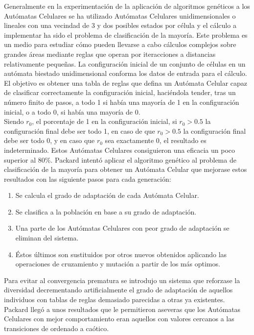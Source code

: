 Generalmente en la experimentación de la aplicación de algoritmos genéticos a los Autómatas Celulares se ha utilizado Autómatas Celulares unidimensionales o lineales con una vecindad de 3 y dos posibles estados por célula y el cálculo a implementar ha sido el problema de clasificación de la mayoría. Este problema es un medio para estudiar cómo pueden llevarse a cabo cálculos complejos sobre grandes áreas mediante reglas que operan por iteracciones a distancias relativamente pequeñas. La configuración inicial de un conjunto de células en un autómata biestado unidimensional conforma los datos de entrada para el cálculo. El objetivo es obtener una tabla de reglas que defina un Autómata Celular capaz de clasificar correctamente la configuración inicial, haciéndola tender, tras un número finito de pasos, a todo 1 si había una mayoría de 1 en la configuración inicial, o a todo 0, si había una mayoría de 0.\\

Siendo $r_0$, el porcentaje de 1 en la configuración inicial,  si $r_0 > 0.5$ la configuración final debe ser todo 1, en caso de que $r_0 > 0.5$ la configuración final debe ser todo 0, y en caso que $r_0$ sea exactamente 0, el resultado es indeterminado. Estos Autómatas Celulares consiguieron una eficacia un poco superior al 80\%. Packard intentó aplicar el algoritmo genético al problema de clasificación de la mayoría para obtener un Autómata Celular que mejorase estos resultados con las siguiente pasos para cada generación:
\begin{enumerate}
\item Se calcula el grado de adaptación de cada Autómata Celular.
\item Se clasifica a la población en base a su grado de adaptación.
\item Una parte de los Autómatas Celulares con peor grado de adaptación se eliminan del sistema.
\item Éstos últimos son sustituidos por otros nuevos obtenidos aplicando las operaciones de cruzamiento y mutación a partir de los más optimos.
\end{enumerate}

Para evitar al convergencia prematura se introdujo un sistema que reforzase la diversidad decrementando artificialmente el grado de adaptación de aquellos individuos con tablas de reglas demasiado parecidas a otras ya existentes. Packard llegó a unos resultados que le permitieron aseveras que los Autómatas Celulares con mejor comportamiento eran aquellos con valores cercanos a las transiciones de ordenado a caótico.\\

